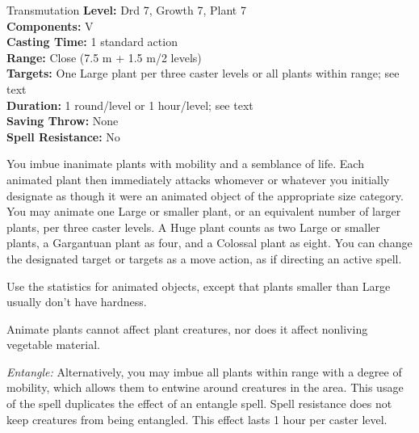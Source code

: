 {Transmutation}
{
	\textbf{Level:}
	Drd 7, Growth 7, Plant 7\\
	\textbf{Components:}
	V\\
	\textbf{Casting Time:}
	1 standard action\\
	\textbf{Range:}
	Close (7.5 m + 1.5 m/2 levels)\\
	\textbf{Targets:}
	One Large plant per three caster levels or all plants within range; see text\\
	\textbf{Duration:}
	1 round/level or 1 hour/level; see text\\
	\textbf{Saving Throw:}
	None\\
	\textbf{Spell Resistance:}
	No\\
}
{
	You imbue inanimate plants with mobility and a semblance of life. Each animated plant then immediately attacks whomever or whatever you initially designate as though it were an animated object of the appropriate size category. You may animate one Large or smaller plant, or an equivalent number of larger plants, per three caster levels. A Huge plant counts as two Large or smaller plants, a Gargantuan plant as four, and a Colossal plant as eight. You can change the designated target or targets as a move action, as if directing an active spell.

	Use the statistics for animated objects, except that plants smaller than Large usually don't have hardness.

	Animate plants cannot affect plant creatures, nor does it affect nonliving vegetable material.

	\textit{Entangle:}
	Alternatively, you may imbue all plants within range with a degree of mobility, which allows them to entwine around creatures in the area. This usage of the spell duplicates the effect of an entangle spell. Spell resistance does not keep creatures from being entangled. This effect lasts 1 hour per caster level.

}
